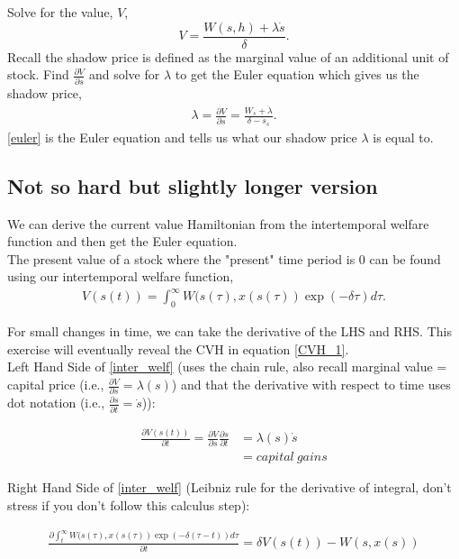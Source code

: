 \documentclass[12pt]{article}
\begin{document}
Solve for the value, $V$, 
$$V = \frac{W(s, h) + \lambda \dot s}{\delta}.$$
Recall the shadow price is defined as the marginal value of an additional unit of stock. Find $\frac{\partial V}{\partial s}$ and solve for $\lambda$ to get the Euler equation which gives us the shadow price,
\begin{align}
    \lambda = \frac{\partial V}{\partial s} = \frac{W_s + \dot \lambda}{\delta - \dot s_s}. \label{euler}
 \end{align}   
\ref{euler} is the Euler equation and tells us what our shadow price $\lambda$ is equal to. 

\subsection{Not so hard but slightly longer version}
We can derive the current value Hamiltonian from the intertemporal welfare function and then get the Euler equation.\\

The present value of a stock where the "present" time period is 0 can be found using our intertemporal welfare function,
\begin{align}
    V(s(t)) = \int_0^\infty W(s(\tau), x(s(\tau)) \exp(-\delta\tau)d\tau. \label{inter_welf}
\end{align}

For small changes in time, we can take the derivative of the LHS and RHS. This exercise will eventually reveal the CVH in equation \ref{CVH_1}. \\

Left Hand Side of \ref{inter_welf} (uses the chain rule, also recall marginal value = capital price (i.e., $\frac{\partial V}{\partial s} = \lambda(s)$) and that the derivative with respect to time uses dot notation (i.e., $\frac{\partial s}{\partial t} = \dot s$)): 

\begin{align}
    \frac{\partial V(s(t))}{\partial t} = \frac{\partial V}{\partial s} \frac{\partial s}{\partial t} &= \lambda(s) \dot s\\
    &= capital \ gains
    \label{LHS}
\end{align}


Right Hand Side of \ref{inter_welf} (Leibniz rule for the derivative of integral, don't stress if you don't follow this calculus step):

\begin{align}
    \frac{\partial \int_t^\infty W(s(\tau), x(s(\tau)) \exp(-\delta(\tau-t))d\tau}{\partial t}= \delta V(s(t)) - W(s, x(s)) 
    \label{RHS}
\end{align}
\end{document}
